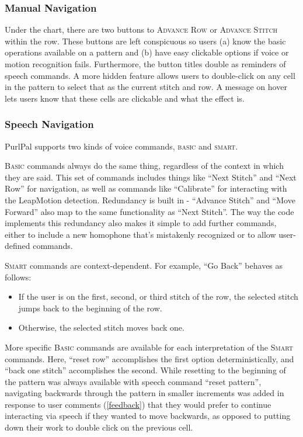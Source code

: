 \documentclass[11pt,twocolumn]{article}
\begin{document}
\subsubsection{Manual Navigation} \label{manNav}

Under the chart, there are two buttons to \textsc{Advance Row} or \textsc{Advance Stitch} within the row.
These buttons are left conspicuous so users (a) know the basic operations available on a pattern and (b) have easy clickable options if voice or motion recognition fails.
Furthermore, the button titles double as reminders of speech commands.
A more hidden feature allows users to double-click on any cell in the pattern to select that as the current stitch and row.
A message on hover lets users know that these cells are clickable and what the effect is.

\subsubsection{Speech Navigation} \label{speechNav}

PurlPal supports two kinds of voice commands, \textsc{basic} and \textsc{smart}.

\textsc{Basic} commands always do the same thing, regardless of the context in which they are said.
This set of commands includes things like ``Next Stitch'' and ``Next Row'' for navigation, as well as commands like ``Calibrate'' for interacting with the LeapMotion detection.
Redundancy is built in - ``Advance Stitch'' and ``Move Forward'' also map to the same functionality as ``Next Stitch''.
The way the code implements this redundancy also makes it simple to add further commands, either to include a new homophone that's mistakenly recognized or to allow user-defined commands.

\textsc{Smart} commands are context-dependent.
For example, ``Go Back'' behaves as follows:
\begin{itemize}
  \item If the user is on the first, second, or third stitch of the row, the selected stitch jumps back to the beginning of the row.
  \item Otherwise, the selected stitch moves back one.
\end{itemize}
More specific \textsc{Basic} commands are available for each interpretation of the \textsc{Smart} commands.
Here, ``reset row'' accomplishes the first option deterministically, and ``back one stitch'' accomplishes the second.
While resetting to the beginning of the pattern was always available with speech command ``reset pattern'', navigating backwards through the pattern in smaller increments was added in response to user comments (\ref{feedback}) that they would prefer to continue interacting via speech if they wanted to move backwards, as opposed to putting down their work to double click on the previous cell.
\end{document}
